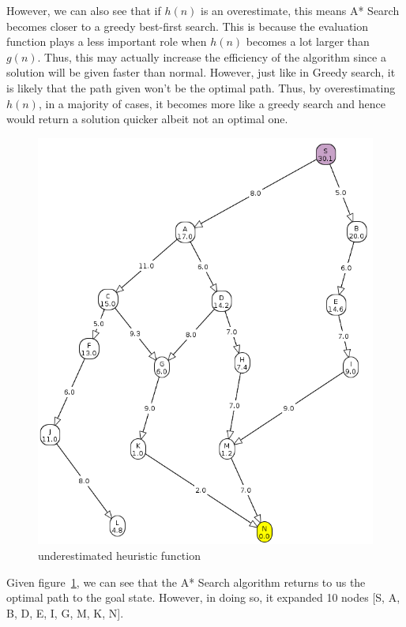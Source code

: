 \documentclass[11pt, A4]{article}
\begin{document}
\noindent However, we can also see that if $h(n)$ is an overestimate, this means A* Search becomes closer to a greedy best-first search. This is because the evaluation function plays a less important role when $h(n)$ becomes a lot larger than $g(n)$. Thus, this may actually increase the efficiency of the algorithm since a solution will be given faster than normal. However, just like in Greedy search, it is likely that the path given won't be the optimal path. Thus, by overestimating $h(n)$, in a majority of cases, it becomes more like a greedy search and hence would return a solution quicker albeit not an optimal one. 

\begin{figure}[H]
\centering
\includegraphics[width = \textwidth]{./underestimate.png}
\caption{underestimated heuristic function}
\label{fig:2c-underestimate}
\end{figure}

\noindent Given figure~\ref{fig:2c-underestimate}, we can see that the A* Search algorithm returns to us the optimal path to the goal state. However, in doing so, it expanded 10 nodes [S, A, B, D, E, I, G, M, K, N]. \\
\end{document}

